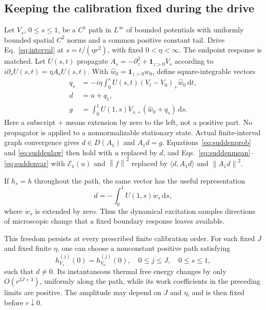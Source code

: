 \documentclass[aps,pra,reprint,superscriptaddress,longbibliography]{revtex4-2}
\newcommand{\dd}{\mathrm d}
\newcommand{\calE}{\mathcal E}
\newcommand{\norm}[1]{\left\lVert#1\right\rVert}
\begin{document}
\subsection{Keeping the calibration fixed during the drive}

Let $V_s$, $0\le s\le1$, be a $C^1$ path in $L^\infty$ of bounded potentials with uniformly bounded spatial $C^2$ norms and a common positive constant tail. Drive Eq.~\eqref{eq:interval} at $s=t/(\eta r^2)$, with fixed $0<\eta<\infty$. The endpoint response is matched. Let $U(s,t)$ propagate $A_s=-\partial_z^2+\mathbf1_{z>0}V_s$ according to $i\partial_sU(s,t)=\eta A_sU(s,t)$. With $\widehat w_0=\mathbf1_{z>0}w_0$, define square-integrable vectors
\begin{align}
 q_s&=-i\eta\int_0^s U(s,t)(V_t-V_0)_+\widehat w_0\,\dd t,
       \label{eq:q}\\
 d&=u+q_1,\nonumber\\
 g&=\int_0^1U(1,s)\dot V_{s,+}(\widehat w_0+q_s)\,\dd s.
       \label{eq:g}
\end{align}
Here a subscript $+$ means extension by zero to the left, not a positive part. No propagator is applied to a nonnormalizable stationary state. Actual finite-interval graph convergence gives $d\in D(A_1)$ and $A_1d=g$. Equations~\eqref{eq:suddenprob} and \eqref{eq:suddenlaw} then hold with $u$ replaced by $d$, and Eqs.~\eqref{eq:suddenmean}--\eqref{eq:suddenvar} with $\calE_1(u)$ and $\norm f^2$ replaced by $\langle d,A_1d\rangle$ and $\norm{A_1d}^2$.

If $h_s=h$ throughout the path, the same vector has the useful representation
\begin{equation}
 d=-\int_0^1U(1,s)\dot w_s\,\dd s,\label{eq:tangentdrive}
\end{equation}
where $\dot w_s$ is extended by zero. Thus the dynamical excitation samples directions of microscopic change that a fixed boundary response leaves available.

This freedom persists at every prescribed finite calibration order. For each fixed $J$ and fixed finite $\eta$, one can choose a nonconstant positive path satisfying
\begin{equation}
 h_{V_s}^{(j)}(0)=h_{V_0}^{(j)}(0),
 \quad 0\le j\le J,\quad 0\le s\le1,\label{eq:jet}
\end{equation}
such that $d\ne0$. Its instantaneous thermal free energy changes by only $O(r^{2J+3})$, uniformly along the path, while its work coefficients in the preceding limits are positive. The amplitude may depend on $J$ and $\eta$, and is then fixed before $r\downarrow0$.
\end{document}
